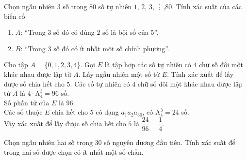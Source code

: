 \begin{vd}%
	Chọn ngẫu nhiên $3$ số trong $80$ số tự nhiên $1$, $2$, $3$, \vdots ,$80$. Tính xác suất của các biến cố
	\begin{enumerate}
		\item $A$: ``Trong $3$ số đó có đúng $2$ số là bội số của $5$''. 
		\item $B$: ``Trong 3 số đó có ít nhất một số chính phương''. 
	\end{enumerate}
\end{vd}

\begin{vd}%
	Cho tập $A=\{0,1,2,3,4\}$. Gọi $E$ là tập hợp các số tự nhiên có $4$ chữ số đôi một khác nhau được lập từ $A$. Lấy ngẫu nhiên một số từ $E$. Tính xác xuất để lấy được số chia hết cho $5$.
	\loigiai
	{
		Các số tự nhiên có $4$ chữ số đôi một khác nhau được lập từ $A$ là $4\cdot\mathrm{A}_4^3=96$ số.\\
		Số phần tử của $E$ là $96$.\\
		Các số thuộc $E$ chia hết cho $5$ có dạng $\overline{a_1a_2a_30}$, có  $\mathrm{A}_4^3=24$ số.\\
		Vậy xác xuất để lấy được số chia hết cho $5$ là $\dfrac{24}{96}=\dfrac{1}{4}$.
	}
\end{vd}

\begin{vd}%
	Chọn ngẫu nhiên hai số trong $ 30 $ số nguyên dương đầu tiên. Tính xác suất để trong hai số được chọn có ít nhất một số chẵn.
\end{vd}

